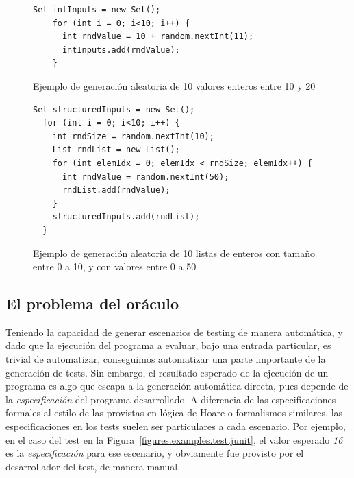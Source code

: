 \begin{figure}
	\begin{lstlisting}[frame=single, mathescape=true,framexleftmargin=1.5em]
    Set intInputs = new Set();
    for (int i = 0; i<10; i++) {
      int rndValue = 10 + random.nextInt(11);
      intInputs.add(rndValue);
    }
	\end{lstlisting}
	\caption{Ejemplo de generaci\'on aleatoria de 10 valores enteros entre 10 y 20}
	\label{figures.examples.testing.random.primitive}
\end{figure}

\begin{figure}
	\begin{lstlisting}[frame=single, mathescape=true,framexleftmargin=1.5em]
  Set structuredInputs = new Set();
  for (int i = 0; i<10; i++) {
    int rndSize = random.nextInt(10);
    List rndList = new List();
    for (int elemIdx = 0; elemIdx < rndSize; elemIdx++) {
      int rndValue = random.nextInt(50);
      rndList.add(rndValue);
    }
    structuredInputs.add(rndList);
  }
	\end{lstlisting}
	\caption{Ejemplo de generaci\'on aleatoria de 10 listas de enteros con tama\~no entre 0 a 10, y con valores entre 0 a 50}
	\label{figures.examples.testing.random.structure}
\end{figure}


\subsection{El problema del or\'aculo}

Teniendo la capacidad de generar escenarios de testing de manera autom\'atica, y dado que la ejecuci\'on del programa a evaluar, bajo una entrada particular, es trivial de automatizar, conseguimos automatizar una parte importante de la generaci\'on de tests. Sin embargo, el resultado esperado de la ejecuci\'on de un programa es algo que escapa a la generaci\'on autom\'atica directa, pues depende de la \emph{especificaci\'on} del programa desarrollado. A diferencia de las especificaciones formales al estilo de las provistas en l\'ogica de Hoare o formalismos similares, las especificaciones en los tests suelen ser particulares a cada escenario. Por ejemplo, en el caso del test en la Figura~\ref{figures.examples.test.junit}, el valor esperado \emph{16} es la \emph{especificaci\'on} para ese escenario, y obviamente fue provisto por el desarrollador del test, de manera manual. 

